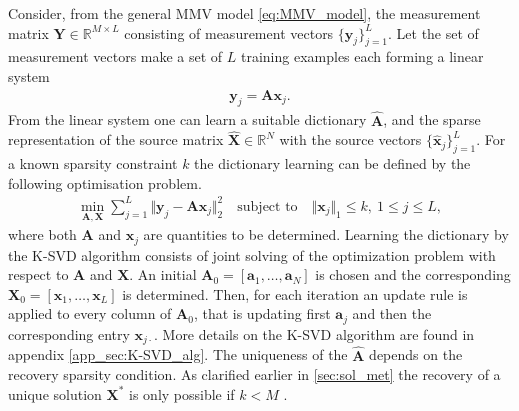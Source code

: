 Consider, from the general MMV model \eqref{eq:MMV_model}, the measurement matrix $\mathbf{Y} \in \mathbb{R}^{M \times L}$ consisting of measurement vectors $\lbrace \mathbf{y}_j \rbrace_{j=1}^L$. Let the set of measurement vectors make a set of $L$ training examples each forming a linear system
\begin{align*}
\mathbf{y}_j = \mathbf{A} \mathbf{x}_j.
\end{align*}
From the linear system one can learn a suitable dictionary $\hat{\mathbf{A}}$, and the sparse representation of the source matrix $\hat{\mathbf{X}} \in \mathbb{R}^N$ with the source vectors $\lbrace \hat{\mathbf{x}}_j \rbrace_{j=1}^L$.
For a known sparsity constraint $k$ the dictionary learning can be defined by the following optimisation problem. 
\begin{align}\label{eq:SVD1}
\min_{\mathbf{A}, \mathbf{X}} \sum_{j=1}^{L} \Vert \mathbf{y}_j - \mathbf{A} \mathbf{x}_j \Vert_2^2 \quad \text{subject to} \quad \Vert \textbf{x}_j \Vert_1 \leq k, \ 1 \leq j \leq L,
\end{align}
where both $\textbf{A}$ and $\textbf{x}_j$ are quantities to be determined.
Learning the dictionary by the K-SVD algorithm consists of joint solving of the optimization problem with respect to $\mathbf{A}$ and $\mathbf{X}$. 
An initial $\textbf{A}_0 = [\textbf{a}_1,\hdots,\textbf{a}_N]$ is chosen and the corresponding $\textbf{X}_0 = [\textbf{x}_1,\hdots,\textbf{x}_L]$ is determined. Then, for each iteration an update rule is applied to every column of $\textbf{A}_0$, that is updating first $\textbf{a}_j$ and then the corresponding entry $\textbf{x}_{j\cdot}$. 
More details on the K-SVD algorithm are found in appendix \ref{app_sec:K-SVD_alg}. 
The uniqueness of the $\hat{\mathbf{A}}$ depends on the recovery sparsity condition. As clarified earlier in \ref{sec:sol_met} the recovery of a unique solution $\mathbf{X}^\ast$ is only possible if $k < M$ \cite{phd2015}.



